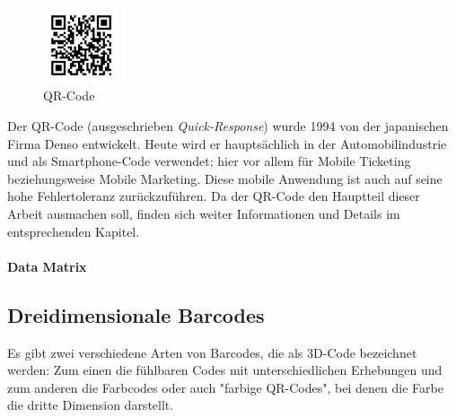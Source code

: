 \begin{figure}
	\centering
	\vspace{-0.65cm}
	\includegraphics[width=0.2\textwidth]{Bilder/QR_Code.png}
	\vspace{-0.2cm}
    \caption[QR-Code]{QR-Code\footnotemark}
	\label{qrcode}	
\end{figure}
Der QR-Code (ausgeschrieben \textit{Quick-Response}) wurde 1994 von der japanischen Firma Denso entwickelt. Heute wird er hauptsächlich in der Automobilindustrie und als Smartphone-Code verwendet; hier vor allem für Mobile Ticketing beziehungsweise Mobile Marketing. Diese mobile Anwendung ist auch auf seine hohe Fehlertoleranz zurückzuführen. Da der QR-Code den Hauptteil dieser Arbeit ausmachen soll, finden sich weiter Informationen und Details im entsprechenden Kapitel.

\paragraph{Data Matrix}


\subsection{Dreidimensionale Barcodes}
Es gibt zwei verschiedene Arten von Barcodes, die als 3D-Code bezeichnet werden:
Zum einen die fühlbaren Codes mit unterschiedlichen Erhebungen und zum anderen die Farbcodes oder auch "farbige QR-Codes", bei denen die Farbe die dritte Dimension darstellt.
~\pagebreak
